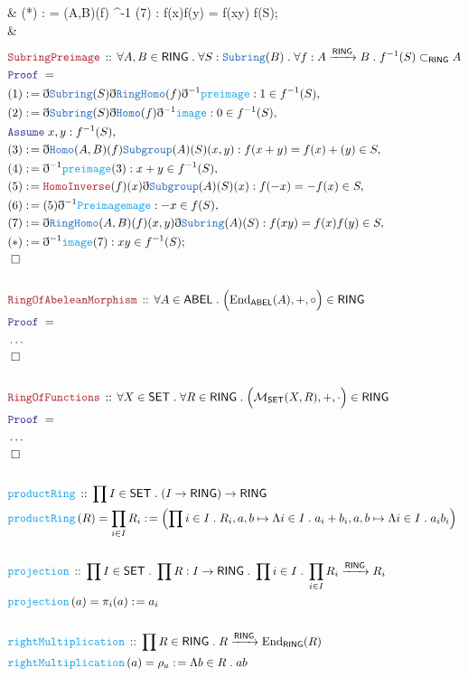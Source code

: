 \documentclass[12pt]{scrartcl}
\newcommand{\TYPE}[1]{\textcolor{NavyBlue}{\mathtt{#1}}}
\newcommand{\FUNC}[1]{\textcolor{Cerulean}{\mathtt{#1}}}
\newcommand{\LOGIC}[1]{\textcolor{Blue}{\mathtt{#1}}}
\newcommand{\THM}[1]{\textcolor{Maroon}{\mathtt{#1}}}
\renewcommand{\.}{\; . \;}
\newcommand{\de}{: \kern 0.1pc =}
\newcommand{\Act}[1]{\left( #1 \right)}
\newcommand{\Theorem}[2]{& \THM{#1} \, :: \, #2 \\ & \Proof = \\ }
\newcommand{\DeclareFunc}[2]{& \FUNC{#1} \, :: \, #2 \\}
\newcommand{\DefineNamedFunc}[4]{&  \FUNC{#1}\Act{#2} = #3 \de #4 \\}
\newcommand{\Page}[1]{ \begin{align*} #1 \end{align*}   }
\newcommand{ \bd }{ \ByDef }
\newcommand{\NoProof}{ & \ldots \\ \EndProof}
\newcommand{\Mor}{\mathcal{M}}
\newcommand{\End}{\mathrm{End}}
\newcommand{\Say}[3]{& #1 \de #2 : #3, \\}
\newcommand{\Conclude}[3]{& #1 \de #2 : #3; \\}
\newcommand{\Assume}[2]{& \LOGIC{Assume} \; #1 : #2, \\}
\newcommand{\QED}{\; \square}
\newcommand{\EndProof}{& \QED \\}
\newcommand{\ByDef}{\eth}
\newcommand{\Proof}{\LOGIC{Proof} \; }
\newcommand{\Arrow}[1]{\xrightarrow{#1}}
\newcommand{\SET}{\mathsf{SET}}
\newcommand{\ABEL}{\mathsf{ABEL}}
\newcommand{\RING}{\mathsf{RING}}
\begin{document}
{	\Conclude{(*)}{\bd \TYPE{RingHomo}(A,B)(f)\bd^{-1} \FUNC{image}(7)}{f(x)f(y) = f(xy) \in f(S)}
	\EndProof
}\Page{
	\Theorem{SubringPreimage}{ \forall A,B \in \RING \. \forall S : \TYPE{Subring}(B) \. \forall f : A \Arrow{\RING} B \. f^{-1}(S) \subset_{\RING} A}
	\Say{(1)}{\bd \TYPE{Subring}(S)\bd \TYPE{RingHomo}(f)\bd^{-1}\FUNC{preimage}}{ 1 \in f^{-1}(S)}
	\Say{(2)}{\bd \TYPE{Subring}(S) \bd \TYPE{Homo}(f) \bd^{-1} \FUNC{image}}{ 0 \in f^{-1}(S)}
	\Assume{x,y}{f^{-1}(S)}
	\Say{(3)}{\bd \TYPE{Homo}(A,B)(f) \TYPE{Subgroup}(A)(S)(x,y)}{f(x + y) = f(x) + (y) \in S}
	\Say{(4)}{\bd^{-1} \FUNC{preimage}(3)}{ x + y \in f^{-1}(S)}
	\Say{(5)}{\THM{HomoInverse}(f)(x)\bd \TYPE{Subgroup}(A)(S)(x)}{  f(-x) =-f(x) \in S}
	\Say{(6)}{ (5) \bd^{-1} \FUNC{Preimagemage}}{  -x  \in f(S)}
	\Say{(7)}{\bd \TYPE{RingHomo}(A,B)(f)(x,y)\bd \TYPE{Subring}(A)(S)}{f(xy) = f(x)f(y) \in S}
	\Conclude{(*)}{\bd^{-1} \FUNC{image}(7)}{  xy \in f^{-1}(S)}
	\EndProof
	\\
	\Theorem{RingOfAbeleanMorphism}{\forall A \in \ABEL \. \Big(\End_{\ABEL}(A),+,\circ\Big) \in \RING}
	\NoProof
	\\
	\Theorem{RingOfFunctions}{\forall X \in \SET \. \forall R \in \RING \. \Big(\Mor_{\SET}(X,R),+,\cdot\Big) \in \RING}
	\NoProof
	\\
	\DeclareFunc{productRing}{ \prod I \in \SET \. (I \to \RING) \to \RING}
	\DefineNamedFunc{productRing}{R}{\prod_{i \in I} R_i}{  \left( \prod i \in I \. R_i, a,b \mapsto \Lambda i \in I \.  a_i + b_i , a,b \mapsto \Lambda i \in I \.  a_ib_i \right)}
	\\
	\DeclareFunc{projection}{\prod I \in \SET \. \prod R : I \to \RING \. \prod i \in I \.  \prod_{i \in I} R_i \Arrow{\RING} R_i }
	\DefineNamedFunc{projection}{a}{\pi_i(a)}{a_i}
	\\
	\DeclareFunc{rightMultiplication}{ \prod R \in \RING \. R \Arrow{\RING} \End_{\RING}(R)}
	\DefineNamedFunc{rightMultiplication}{a}{\rho_a}{ \Lambda b \in R \. ab}
}
\end{document}
